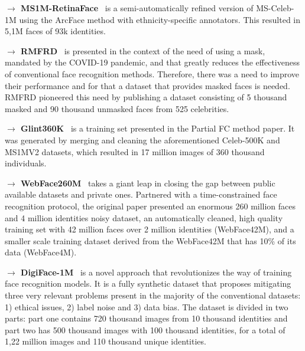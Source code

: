 \documentclass[class=report, crop=false, a4paper, 12pt]{standalone}
\begin{document}
\vspace{0.7\baselineskip}
\noindent\textbf{$\rightarrow$ MS1M-RetinaFace}~\autocite{dengLightweightFaceRecognition2019} is a semi-automatically refined version of MS-Celeb-1M using the ArcFace method with ethnicity-specific annotators. This resulted in 5,1M faces of 93k identities.

\vspace{0.7\baselineskip}
\noindent\textbf{$\rightarrow$ RMFRD}~\autocite{wangMaskedFaceRecognition2020} is presented in the context of the need of using a mask, mandated by the COVID-19 pandemic, and that greatly reduces the effectiveness of conventional face recognition methods. Therefore, there was a need to improve their performance and for that a dataset that provides masked faces is needed. RMFRD pioneered this need by publishing a dataset consisting of 5 thousand masked and 90 thousand unmasked faces from 525 celebrities.

\vspace{0.7\baselineskip}
\noindent\textbf{$\rightarrow$ Glint360K}~\autocite{anPartialFCTraining2021} is a training set presented in the Partial FC method paper. It was generated by merging and cleaning the aforementioned Celeb-500K and MS1MV2 datasets, which resulted in 17 million images of 360 thousand individuals.

\vspace{0.7\baselineskip}
\noindent\textbf{$\rightarrow$ WebFace260M}~\autocite{zhuWebFace260MBenchmarkUnveiling2021} takes a giant leap in closing the gap between public available datasets and private ones. Partnered with a time-constrained face recognition protocol, the original paper presented an enormous 260 million faces and 4 million identities noisy dataset, an automatically cleaned, high quality training set with 42 million faces over 2 million identities (WebFace42M), and a smaller scale training dataset derived from the WebFace42M that has 10\% of its data (WebFace4M).

\vspace{0.7\baselineskip}
\noindent\textbf{$\rightarrow$ DigiFace-1M}~\autocite{baeDigiFace1MMillionDigital2023} is a novel approach that revolutionizes the way of training face recognition models. It is a fully synthetic dataset that proposes mitigating three very relevant problems present in the majority of the conventional datasets: 1) ethical issues, 2) label noise and 3) data bias. The dataset is divided in two parts: part one contains 720 thousand images from 10 thousand identities and part two has 500 thousand images with 100 thousand identities, for a total of 1,22 million images and 110 thousand unique identities.
\end{document}
